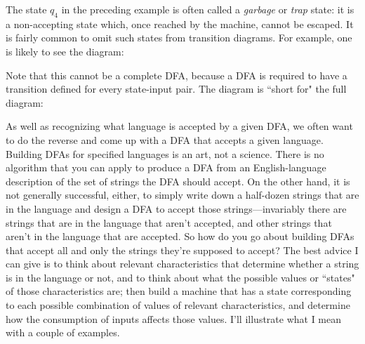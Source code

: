 The state $q_4$ in the preceding example is often called a {\em garbage} or {\em
trap} state: it is a non-accepting state which, once reached by the machine,
cannot be escaped.  It is fairly common to omit such states from transition
diagrams.  For example, one is likely to see the diagram:


Note that this cannot be a complete DFA, because a DFA is required to have a
transition defined for every state-input pair.  The diagram is ``short for" the
full diagram:



As well as recognizing what language is accepted by a given DFA, we often want to
do the reverse and come up with a DFA that accepts a given language.
Building DFAs for specified languages is an art, not a science.
There is no algorithm that you can apply to produce a DFA from an English-language
description of the set of strings the DFA should accept.  On the other hand, it
is not generally successful, either, to simply write down a half-dozen strings
that are in the language and design a DFA to accept those strings---invariably
there are strings that are in the language that aren't accepted, and other
strings that aren't in the language that are accepted.  So how do you go about
building DFAs that accept all and only the strings they're supposed to accept?
The best advice I can give is to
think about relevant characteristics that determine whether a string is in the
language or not, and to think about what the possible values or ``states" of 
those characteristics
are; then build a machine that has a state corresponding to each possible
combination of values of relevant characteristics, and determine how the
consumption of inputs affects those values.  I'll illustrate what I mean with a
couple of examples.
